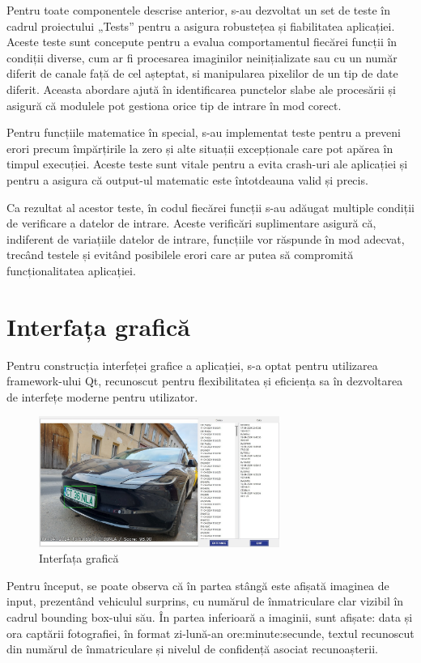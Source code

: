 \documentclass[a4paper,12pt]{report}
\begin{document}
Pentru toate componentele descrise anterior, s-au dezvoltat un set de teste în cadrul proiectului „Tests” pentru a asigura robustețea și fiabilitatea aplicației. Aceste teste sunt concepute pentru a evalua comportamentul fiecărei funcții în condiții diverse, cum ar fi procesarea imaginilor neinițializate sau cu un număr diferit de canale față de cel așteptat, si manipularea pixelilor de un tip de date diferit. Aceasta abordare ajută în identificarea punctelor slabe ale procesării și asigură că modulele pot gestiona orice tip de intrare în mod corect.

Pentru funcțiile matematice în special, s-au implementat teste pentru a preveni erori precum împărțirile la zero și alte situații excepționale care pot apărea în timpul execuției. Aceste teste sunt vitale pentru a evita crash-uri ale aplicației și pentru a asigura că output-ul matematic este întotdeauna valid și precis.

Ca rezultat al acestor teste, în codul fiecărei funcții s-au adăugat multiple condiții de verificare a datelor de intrare. Aceste verificări suplimentare asigură că, indiferent de variațiile datelor de intrare, funcțiile vor răspunde în mod adecvat, trecând testele și evitând posibilele erori care ar putea să compromită funcționalitatea aplicației.

\section{Interfața grafică}
Pentru construcția interfeței grafice a aplicației, s-a optat pentru utilizarea framework-ului Qt, recunoscut pentru flexibilitatea și eficiența sa în dezvoltarea de interfețe moderne pentru utilizator.

\begin{figure}[h!]
    \centering
    \includegraphics[width=0.7\textwidth]{images/gui.jpg}
    \caption{Interfața grafică}
\end{figure}
\FloatBarrier

Pentru început, se poate observa că în partea stângă este afișată imaginea de input, prezentând vehiculul surprins, cu numărul de înmatriculare clar vizibil în cadrul bounding box-ului său. În partea inferioară a imaginii, sunt afișate: data și ora captării fotografiei, în format zi-lună-an ore:minute:secunde, textul recunoscut din numărul de înmatriculare și nivelul de confidență asociat recunoașterii.
\end{document}
